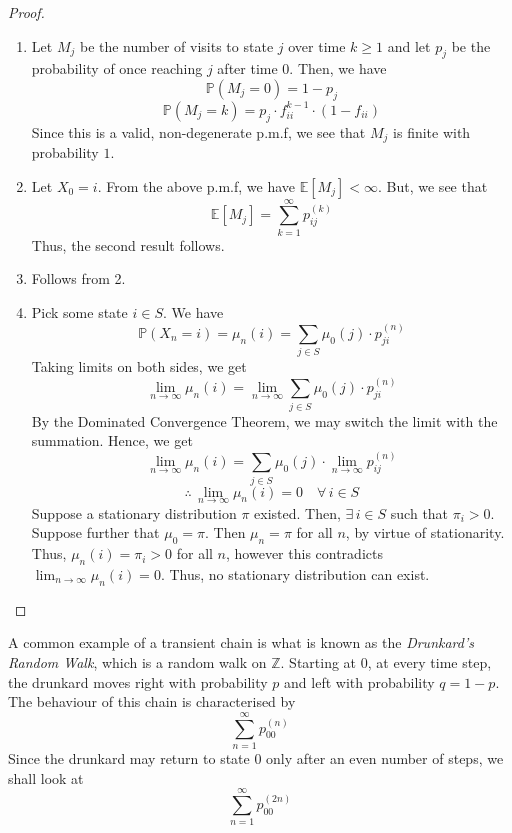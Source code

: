 \documentclass[12pt]{article}
\def\P{\mathbb{P}}
\theoremstyle{definition}
\begin{document}
\begin{proof}
    \begin{enumerate}
        \item Let $M_j$ be the number of visits to state $j$ over time $k \geq 1$ and let $p_j$ be the probability of once reaching $j$ after time $0$. Then, we have
        \[
            \P \left( M_j = 0 \right) = 1- p_j
        \]
        \[
            \P \left( M_j = k \right) = p_j \cdot f_{ii}^{k-1} \cdot (1 -f_{ii})
        \]
        Since this is a valid, non-degenerate p.m.f, we see that $M_j$ is finite with probability $1$.
        
        \item Let $X_0 = i$. From the above p.m.f, we have $\mathbb{E} \left[ M_j \right] < \infty$. But, we see that 
        \[
            \mathbb{E} \left[ M_j \right] = \sum_{k=1}^{\infty} p_{ij}^{(k)}
        \]
        Thus, the second result follows.
        
        \item Follows from 2. 
        
        \item Pick some state $i \in S$. We have
        \[
            \P \left( X_n = i \right) = \mu_n(i) = \sum_{j \in S} \mu_0(j) \cdot p_{ji}^{(n)}
        \]
        Taking limits on both sides, we get
        \[
            \lim_{n \to \infty} \mu_n(i) = \lim_{n \to \infty} \sum_{j \in S} \mu_0(j) \cdot p_{ji}^{(n)}
        \]
        By the Dominated Convergence Theorem, we may switch the limit with the summation. Hence, we get
        \[
            \lim_{n \to \infty} \mu_n(i) = \sum_{j \in S} \mu_0(j) \cdot \lim_{n \to \infty} p_{ij}^{(n)} 
        \]
        \[
            \therefore \, \lim_{n \to \infty} \mu_n(i) = 0 \quad \forall \, i \in S
        \]
        Suppose a stationary distribution $\pi$ existed. Then, $\exists \, i \in S$ such that $\pi_i > 0$. Suppose further that $\mu_0 = \pi$. Then $\mu_n = \pi$ for all $n$, by virtue of stationarity. Thus, $\mu_n(i) = \pi_i > 0$ for all $n$, however this contradicts $\lim_{n \to \infty} \mu_n(i) = 0$. Thus, no stationary distribution can exist.
    \end{enumerate}
\end{proof}

A common example of a transient chain is what is known as the \emph{Drunkard's Random Walk}, which is a random walk on $\mathbb{Z}$. Starting at $0$, at every time step, the drunkard moves right with probability $p$ and left with probability $q = 1-p$. The behaviour of this chain is characterised by
\[
    \sum_{n=1}^{\infty} p_{00}^{(n)} 
\]
Since the drunkard may return to state $0$ only after an even number of steps, we shall look at 
\[
    \sum_{n=1}^{\infty} p_{00}^{(2n)}
\]
\end{document}
